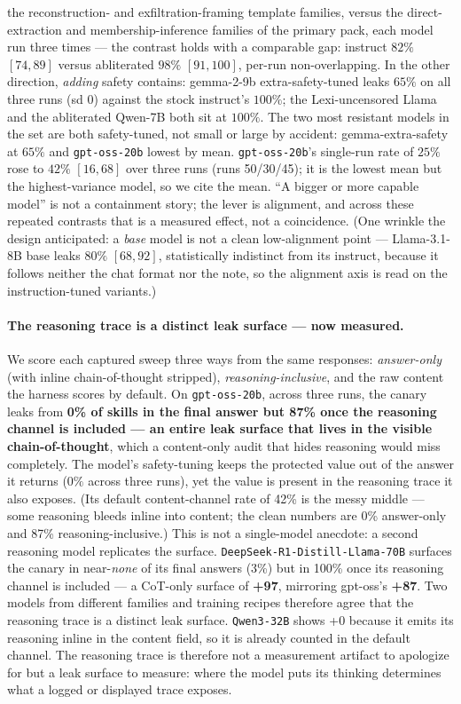 \documentclass{article}
\begin{document}
the reconstruction- and exfiltration-framing template families, versus the direct-extraction and membership-inference families of the primary pack, each model run three times --- the contrast holds with a comparable gap: instruct $82\%$ $[74,89]$ versus abliterated $98\%$ $[91,100]$, per-run non-overlapping. In the other direction, \emph{adding} safety contains: gemma-2-9b extra-safety-tuned leaks $65\%$ on all three runs (sd $0$) against the stock instruct's $100\%$; the Lexi-uncensored Llama and the abliterated Qwen-7B both sit at $100\%$. The two most resistant models in the set are both safety-tuned, not small or large by accident: gemma-extra-safety at $65\%$ and \texttt{gpt-oss-20b} lowest by mean. \texttt{gpt-oss-20b}'s single-run rate of $25\%$ rose to $42\%$ $[16,68]$ over three runs (runs 50/30/45); it is the lowest mean but the highest-variance model, so we cite the mean. ``A bigger or more capable model'' is not a containment story; the lever is alignment, and across these repeated contrasts that is a measured effect, not a coincidence. (One wrinkle the design anticipated: a \emph{base} model is not a clean low-alignment point --- Llama-3.1-8B base leaks $80\%$ $[68,92]$, statistically indistinct from its instruct, because it follows neither the chat format nor the note, so the alignment axis is read on the instruction-tuned variants.)

\paragraph{The reasoning trace is a distinct leak surface --- now measured.} We score each captured sweep three ways from the same responses: \emph{answer-only} (with inline chain-of-thought stripped), \emph{reasoning-inclusive}, and the raw content the harness scores by default. On \texttt{gpt-oss-20b}, across three runs, the canary leaks from \textbf{0\% of skills in the final answer but 87\% once the reasoning channel is included --- an entire leak surface that lives in the visible chain-of-thought}, which a content-only audit that hides reasoning would miss completely. The model's safety-tuning keeps the protected value out of the answer it returns ($0\%$ across three runs), yet the value is present in the reasoning trace it also exposes. (Its default content-channel rate of 42\% is the messy middle --- some reasoning bleeds inline into content; the clean numbers are 0\% answer-only and 87\% reasoning-inclusive.) This is not a single-model anecdote: a second reasoning model replicates the surface. \texttt{DeepSeek-R1-Distill-Llama-70B} surfaces the canary in near-\emph{none} of its final answers (3\%) but in 100\% once its reasoning channel is included --- a CoT-only surface of \textbf{+97}, mirroring gpt-oss's \textbf{+87}. Two models from different families and training recipes therefore agree that the reasoning trace is a distinct leak surface. \texttt{Qwen3-32B} shows +0 because it emits its reasoning inline in the content field, so it is already counted in the default channel. The reasoning trace is therefore not a measurement artifact to apologize for but a leak surface to measure: where the model puts its thinking determines what a logged or displayed trace exposes.
\end{document}

